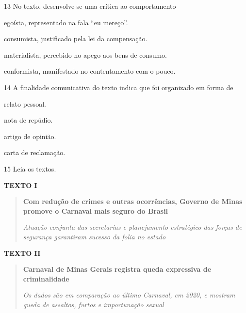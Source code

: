 \num{13} No texto, desenvolve-se uma crítica ao comportamento

\begin{escolha}
\item egoísta, representado na fala ``eu mereço''.

\item consumista, justificado pela lei da compensação.

\item materialista, percebido no apego aos bens de consumo.

\item conformista, manifestado no contentamento com o pouco.
\end{escolha}

\num{14} A finalidade comunicativa do texto indica que foi organizado em forma de

\begin{escolha}
\item relato pessoal.

\item nota de repúdio.

\item artigo de opinião.

\item carta de reclamação.
\end{escolha}


\num{15} Leia os textos.

\textbf{TEXTO I}

\begin{quote}
\textbf{Com redução de crimes e outras ocorrências, Governo de Minas
promove o Carnaval mais seguro do Brasil}

\textit{Atuação conjunta das secretarias e planejamento estratégico das
forças de segurança garantiram sucesso da folia no estado}

\end{quote}


\textbf{TEXTO II}

\begin{quote}
\textbf{Carnaval de Minas Gerais registra queda expressiva de
criminalidade}

\textit{Os dados são em comparação ao último Carnaval, em 2020, e mostram
queda de assaltos, furtos e importunação sexual}

\end{quote}

